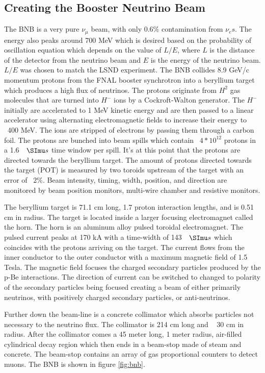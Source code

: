 \subsection{Creating the Booster Neutrino Beam}
The BNB is a very pure $\nu_{\mu}$ beam, with only 0.6\% contamination from $\nu_{e}s$. The energy also peaks around 700 MeV which is desired based on the probability of oscillation equation which depends on the value of $L/E$, where $L$ is the distance of the detector from the neutrino beam and $E$ is the energy of the neutrino beam. $L/E$ was chosen to match the LSND experiment. The BNB collides 8.9 GeV/c momentum protons from the FNAL booster synchrotron into a beryllium target which produces a high flux of neutrinos. The protons originate from $H^2$ gas molecules that are turned into $H^-$ ions by a Cockroft-Walton generator. The $H^-$ initially are accelerated to 1 MeV kinetic energy and are then passed to a linear accelerator using alternating electromagnetic fields to increase their energy to ~400 MeV. The ions are stripped of electrons by passing them through a carbon foil. The protons are bunched into beam spills which contain ~$4*10^12$ protons in a 1.6 $\micro s$ time window per spill. 
It's at this point that the protons are directed towards the beryllium target. The amount of protons directed towards the target (POT) is measured by two toroids upstream of the target with an error of ~2$\%$. Beam intensity, timing, width, position, and direction are monitored by beam position monitors, multi-wire chamber and resistive monitors. 

The beryllium target is 71.1 cm long, 1.7 proton interaction lengths, and is 0.51 cm in radius. The target is located inside a larger focusing electromagnet called the horn. The horn is an aluminum alloy pulsed toroidal electromagnet. The pulsed current peaks at 170 kA with a time-width of 143 $\micro s$ which coincides with the protons arriving on the target. The current flows from the inner conductor to the outer conductor with a maximum magnetic field of 1.5 Tesla. The magnetic field focuses the charged secondary particles produced by the p-Be interactions. The direction of current can be switched to changed to polarity of the secondary particles being focused creating a beam of either primarily neutrinos, with positively charged secondary particles, or anti-neutrinos. 

Further down the beam-line is a concrete collimator which absorbs particles not necessary to the neutrino flux. The collimator is 214 cm long and ~ 30 cm in radius. After the collimator comes a 45 meter long, 1 meter radius, air-filled cylindrical decay region which then ends in a beam-stop made of steam and concrete. The beam-stop contains an array of gas proportional counters to detect muons. The BNB is shown in figure \ref{fig:bnb}.      

